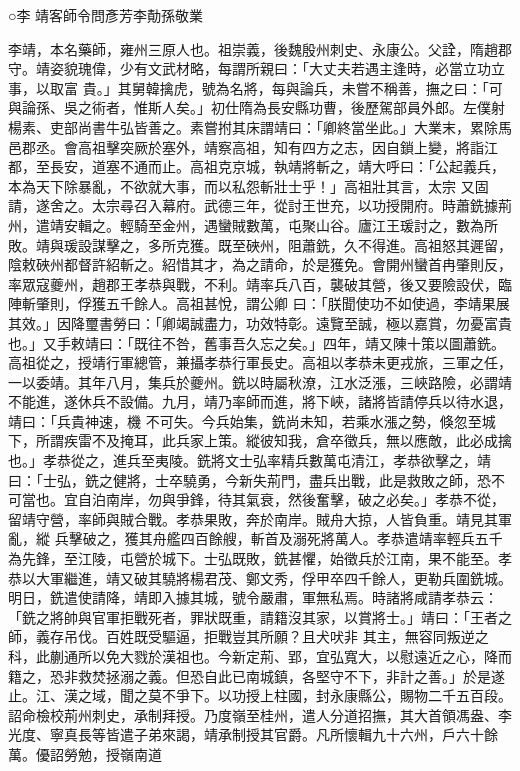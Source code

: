 
\begin{pinyinscope}

 ○李
 靖客師令問彥芳李勣孫敬業



 李靖，本名藥師，雍州三原人也。祖崇義，後魏殷州刺史、永康公。父詮，隋趙郡守。靖姿貌瑰偉，少有文武材略，每謂所親曰：「大丈夫若遇主逢時，必當立功立事，以取富
 貴。」其舅韓擒虎，號為名將，每與論兵，未嘗不稱善，撫之曰：「可與論孫、吳之術者，惟斯人矣。」初仕隋為長安縣功曹，後歷駕部員外郎。左僕射楊素、吏部尚書牛弘皆善之。素嘗拊其床謂靖曰：「卿終當坐此。」大業末，累除馬邑郡丞。會高祖擊突厥於塞外，靖察高祖，知有四方之志，因自鎖上變，將詣江都，至長安，道塞不通而止。高祖克京城，執靖將斬之，靖大呼曰：「公起義兵，本為天下除暴亂，不欲就大事，而以私怨斬壯士乎！」高祖壯其言，太宗
 又固請，遂舍之。太宗尋召入幕府。武德三年，從討王世充，以功授開府。時蕭銑據荊州，遣靖安輯之。輕騎至金州，遇蠻賊數萬，屯聚山谷。廬江王瑗討之，數為所敗。靖與瑗設謀擊之，多所克獲。既至硤州，阻蕭銑，久不得進。高祖怒其遲留，陰敕硤州都督許紹斬之。紹惜其才，為之請命，於是獲免。會開州蠻首冉肇則反，率眾寇夔州，趙郡王孝恭與戰，不利。靖率兵八百，襲破其營，後又要險設伏，臨陣斬肇則，俘獲五千餘人。高祖甚悅，謂公卿
 曰：「朕聞使功不如使過，李靖果展其效。」因降璽書勞曰：「卿竭誠盡力，功效特彰。遠覽至誠，極以嘉賞，勿憂富貴也。」又手敕靖曰：「既往不咎，舊事吾久忘之矣。」四年，靖又陳十策以圖蕭銑。高祖從之，授靖行軍總管，兼攝孝恭行軍長史。高祖以孝恭未更戎旅，三軍之任，一以委靖。其年八月，集兵於夔州。銑以時屬秋潦，江水泛漲，三峽路險，必謂靖不能進，遂休兵不設備。九月，靖乃率師而進，將下峽，諸將皆請停兵以待水退，靖曰：「兵貴神速，機
 不可失。今兵始集，銑尚未知，若乘水漲之勢，倏忽至城下，所謂疾雷不及掩耳，此兵家上策。縱彼知我，倉卒徵兵，無以應敵，此必成擒也。」孝恭從之，進兵至夷陵。銑將文士弘率精兵數萬屯清江，孝恭欲擊之，靖曰：「士弘，銑之健將，士卒驍勇，今新失荊門，盡兵出戰，此是救敗之師，恐不可當也。宜自泊南岸，勿與爭鋒，待其氣衰，然後奮擊，破之必矣。」孝恭不從，留靖守營，率師與賊合戰。孝恭果敗，奔於南岸。賊舟大掠，人皆負重。靖見其軍亂，縱
 兵擊破之，獲其舟艦四百餘艘，斬首及溺死將萬人。孝恭遣靖率輕兵五千為先鋒，至江陵，屯營於城下。士弘既敗，銑甚懼，始徵兵於江南，果不能至。孝恭以大軍繼進，靖又破其驍將楊君茂、鄭文秀，俘甲卒四千餘人，更勒兵圍銑城。明日，銑遣使請降，靖即入據其城，號令嚴肅，軍無私焉。時諸將咸請孝恭云：「銑之將帥與官軍拒戰死者，罪狀既重，請籍沒其家，以賞將士。」靖曰：「王者之師，義存吊伐。百姓既受驅逼，拒戰豈其所願？且犬吠非
 其主，無容同叛逆之科，此蒯通所以免大戮於漢祖也。今新定荊、郢，宜弘寬大，以慰遠近之心，降而籍之，恐非救焚拯溺之義。但恐自此已南城鎮，各堅守不下，非計之善。」於是遂止。江、漢之域，聞之莫不爭下。以功授上柱國，封永康縣公，賜物二千五百段。詔命檢校荊州刺史，承制拜授。乃度嶺至桂州，遣人分道招撫，其大首領馮盎、李光度、寧真長等皆遣子弟來謁，靖承制授其官爵。凡所懷輯九十六州，戶六十餘萬。優詔勞勉，授嶺南道

\end{pinyinscope}
